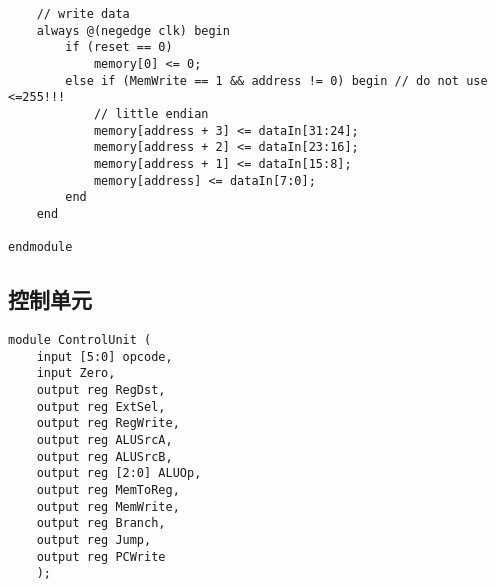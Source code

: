 \begin{multicols}{2}
\begin{lstlisting}
    // write data
    always @(negedge clk) begin
        if (reset == 0)
            memory[0] <= 0;
        else if (MemWrite == 1 && address != 0) begin // do not use <=255!!!
            // little endian
            memory[address + 3] <= dataIn[31:24];
            memory[address + 2] <= dataIn[23:16];
            memory[address + 1] <= dataIn[15:8];
            memory[address] <= dataIn[7:0];
        end
    end

endmodule
\end{lstlisting}

\subsection{控制单元}
\begin{lstlisting}
module ControlUnit (
    input [5:0] opcode,
    input Zero,
    output reg RegDst,
    output reg ExtSel,
    output reg RegWrite,
    output reg ALUSrcA,
    output reg ALUSrcB,
    output reg [2:0] ALUOp,
    output reg MemToReg,
    output reg MemWrite,
    output reg Branch,
    output reg Jump,
    output reg PCWrite
    );


\end{lstlisting}
\end{multicols}
